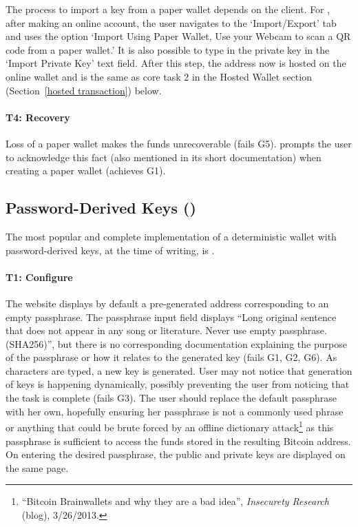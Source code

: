 The process to import a key from a paper wallet depends on the client. For \block, after making an online account, the user navigates to the `Import/Export' tab and uses the option `Import Using Paper Wallet, Use your Webcam to scan a QR code from a paper wallet.' It is also possible to type in the private key in the `Import Private Key' text field. After this step, the address now is hosted on the online wallet and is the same as core task 2 in the Hosted Wallet section (Section~\ref{hosted transaction}) below.


\paragraph{T4: Recovery} Loss of a paper wallet makes the funds unrecoverable (fails G5). \paper prompts the user to acknowledge this fact (also mentioned in its short documentation) when creating a paper wallet (achieves G1).

\subsection{Password-Derived Keys (\brain)} 
The most popular and complete implementation of a deterministic wallet with password-derived keys, at the time of writing, is \brain.

\paragraph{T1: Configure} The \brain website displays by default a pre-generated address corresponding to an empty passphrase. The passphrase input field displays ``Long original sentence that does not appear in any song or literature. Never use empty passphrase. (SHA256)'', but there is no corresponding documentation explaining the purpose of the passphrase or how it relates to the generated key (fails G1, G2, G6). As characters are typed, a new key is generated. User may not notice that generation of keys is happening dynamically, possibly preventing the user from noticing that the task is complete (fails G3). The user should replace the default passphrase with her own, hopefully ensuring her passphrase is not a commonly used phrase or anything that could be brute forced by an offline dictionary attack\footnote{``Bitcoin Brainwallets and why they are a bad idea'', \textit{Insecurety Research} (blog), 3/26/2013.} as this passphrase is sufficient to access the funds stored in the resulting Bitcoin address. On entering the desired passphrase, the public and private keys are displayed on the same page.

